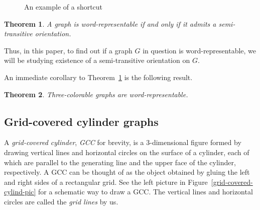 \documentclass[12pt]{article}
\newtheorem{thm}{Theorem}[section]
\numberwithin{equation}{section}
\begin{document}
\begin{figure}[!htbp]
 \begin{center}

\caption{ An example of a shortcut}\label{shortcut}
\end{center}
\end{figure}

\begin{thm}\label{semitra}
 {\em \cite{Halldorsson11}} A graph is word-representable if and only if it admits a semi-transitive orientation.
\end{thm}

Thus, in this paper, to find out if a graph $G$ in question is word-representable, we will be studying existence of a semi-transitive orientation on $G$.

An immediate corollary to Theorem~\ref{semitra} is the following result.

\begin{thm}{\label{color}} {\em \cite{Halldorsson11}} Three-colorable graphs are word-representable.
\end{thm}

\subsection{Grid-covered cylinder graphs}\label{GCC-sub}

A {\em grid-covered cylinder}, {\em GCC} for brevity, is a 3-dimensional figure formed by drawing vertical lines and horizontal circles on the surface of a cylinder, each of which are parallel to the generating line and the upper face of the cylinder, respectively. A GCC can be thought of as the object obtained by gluing the left and right sides of a rectangular grid. See the left picture in Figure~\ref{grid-covered-cylind-pic} for a schematic way to draw a GCC.  The vertical lines and horizontal circles are called the {\em grid lines} by us.
\end{document}
